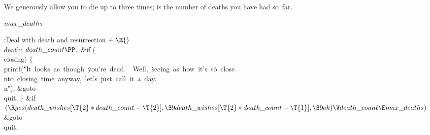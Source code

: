 We generously allow you to die up to three times;  is the
number of deaths you have had so~far.

\Y\B\4\D$\\{max\_deaths}$ \5
\par
\Y\B\4:Deal with death and resurrection\X${}\mathrel+\E{}$\6
\4\\{death}:\5
${}\\{death\_count}\PP;{}$\6
\&{if} (\\{closing})\5
${}\{{}$\1\6
\\{printf}(\.{"It\ looks\ as\ though\ }\)\.{you're\ dead.\ \ Well,\ }\)\.{seeing\ as\ how\ it's\ s}\)\.{o\ close\\nto\ closing\ }\)\.{time\ anyway,\ let's\ j}\)\.{ust\ call\ it\ a\ day.\\n}\)\.{"});\6
\&{goto} \\{quit};\6
\4${}\}{}$\2\6
\&{if} ${}(\R\\{yes}(\\{death\_wishes}[\T{2}*\\{death\_count}-\T{2}],\39\\{death\_wishes}[\T{2}*\\{death\_count}-\T{1}],\39\\{ok})\V\\{death\_count}\E\\{max\_deaths}){}$\1\5
\&{goto} \\{quit};\2\par
\fi

